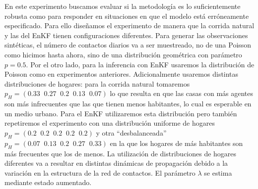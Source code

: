 En este experimento buscamos evaluar si la metodología es lo suficientemente robusta como para responder en situaciones en que el modelo está erróneamente especificado. Para ello diseñamos el experimento de manera que la corrida natural y las del EnKF tienen configuraciones diferentes. Para generar las observaciones sintéticas, el número de contactos diarios va a ser muestreado, no de una Poisson como hicimos hasta ahora, sino de una distribución geométrica con parámetro $p = 0.5$. Por el otro lado, para la inferencia con EnKF usaremos la distribución de Poisson como en experimentos anteriores. Adicionalmente usaremos distintas distribuciones de hogares: para la corrida natural tomaremos $p_H = (0.33\;\; 0.27\;\; 0.2\;\; 0.13\;\; 0.07)$ lo que resulta en que las casas con más agentes son más infrecuentes que las que tienen menos habitantes, lo cual es esperable en un medio urbano. Para el EnKF utilizaremos esta distribución pero también repetiremos el experimento con una distribución uniforme de hogares $p_H = (0.2\;\; 0.2\;\; 0.2\;\; 0.2\;\; 0.2)$ y otra ``desbalanceada'' $p_H = (0.07\;\; 0.13\;\; 0.2\;\; 0.27\;\; 0.33)$ en la que los hogares de más habitantes son más frecuentes que los de menos. La utilización de distribuciones de hogares diferentes va a resultar en distintas dinámicas de propagación debido a la variación en la estructura de la red de contactos. El parámetro $\lambda$ se estima mediante estado aumentado.

